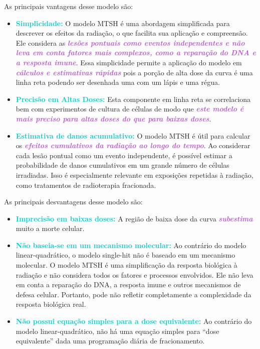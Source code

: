 \documentclass[11pt,a4paper]{article}
\begin{document}
	  As principais vantagens desse modelo são:

	  \begin{itemize}
		\item \textcolor{DarkTurquoise}{\textbf{Simplicidade:}} O modelo MTSH é uma abordagem simplificada para descrever os efeitos da radiação, o que facilita sua aplicação e compreensão. Ele considera as \textcolor{MediumOrchid}{\textbf{\textit{lesões pontuais como eventos independentes e não leva em conta fatores mais complexos, como a reparação do DNA e a resposta imune}}}. Essa simplicidade permite a aplicação do modelo em \textcolor{MediumOrchid}{\textbf{\textit{cálculos e estimativas rápidas}}} pois a porção de alta dose da curva é uma linha reta podendo ser desenhada uma com um lápis e uma régua.
		\item \textcolor{DarkTurquoise}{\textbf{Precisão em Altas Doses:}} Esta componente em linha reta se correlaciona bem com experimentos de cultura de células de modo que \textcolor{MediumOrchid}{\textbf{\textit{este modelo é mais preciso para altas doses do que para baixas doses}}}.
		\item \textcolor{DarkTurquoise}{\textbf{Estimativa de danos acumulativo:}} O modelo MTSH é útil para calcular os \textcolor{MediumOrchid}{\textbf{\textit{efeitos cumulativos da radiação ao longo do tempo}}}. Ao considerar cada lesão pontual como um evento independente, é possível estimar a probabilidade de danos cumulativos em um grande número de células irradiadas. Isso é especialmente relevante em exposições repetidas à radiação, como tratamentos de radioterapia fracionada.
	  \end{itemize}

	  As principais desvantagens desse modelo são:

	  \begin{itemize}
		\item \textcolor{DarkTurquoise}{\textbf{Imprecisão em baixas doses:}} A região de baixa dose da curva \textcolor{MediumOrchid}{\textbf{\textit{subestima}}} muito a morte celular.
		\item \textcolor{DarkTurquoise}{\textbf{Não baseia-se em um mecanismo molecular:}} Ao contrário do modelo linear-quadrático, o modelo single-hit não é baseado em um mecanismo molecular. O modelo MTSH é uma simplificação da resposta biológica à radiação e não considera todos os fatores e processos envolvidos. Ele não leva em conta a reparação do DNA, a resposta imune e outros mecanismos de defesa celular. Portanto, pode não refletir completamente a complexidade da resposta biológica real.
		\item \textcolor{DarkTurquoise}{\textbf{Não possui equação simples para a dose equivalente:}} Ao contrário do modelo linear-quadrático, não há uma equação simples para “dose equivalente” dada uma programação diária de fracionamento. 
	  \end{itemize} 
\end{document}
